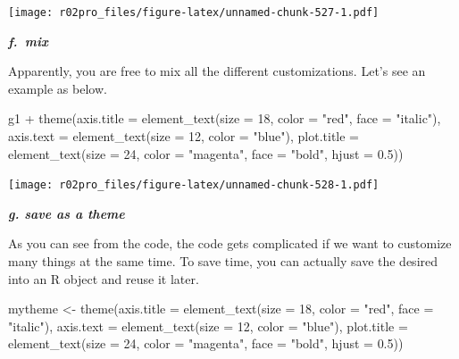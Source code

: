 \documentclass[
]{book}
\newenvironment{Shaded}{\begin{snugshade}}{\end{snugshade}}
\newcommand{\AttributeTok}[1]{\textcolor[rgb]{0.77,0.63,0.00}{#1}}
\newcommand{\DecValTok}[1]{\textcolor[rgb]{0.00,0.00,0.81}{#1}}
\newcommand{\FloatTok}[1]{\textcolor[rgb]{0.00,0.00,0.81}{#1}}
\newcommand{\FunctionTok}[1]{\textcolor[rgb]{0.00,0.00,0.00}{#1}}
\newcommand{\NormalTok}[1]{#1}
\newcommand{\OtherTok}[1]{\textcolor[rgb]{0.56,0.35,0.01}{#1}}
\newcommand{\SpecialCharTok}[1]{\textcolor[rgb]{0.00,0.00,0.00}{#1}}
\newcommand{\StringTok}[1]{\textcolor[rgb]{0.31,0.60,0.02}{#1}}
\begin{document}
\texttt{[image: r02pro\_files/figure-latex/unnamed-chunk-527-1.pdf]}

\textbf{\emph{f.~mix}}

Apparently, you are free to mix all the different customizations. Let's see an example as below.

\begin{Shaded}
\begin{Highlighting}[]
\NormalTok{g1 }\SpecialCharTok{+} \FunctionTok{theme}\NormalTok{(}\AttributeTok{axis.title =} \FunctionTok{element\_text}\NormalTok{(}\AttributeTok{size =} \DecValTok{18}\NormalTok{, }\AttributeTok{color =} \StringTok{"red"}\NormalTok{, }\AttributeTok{face =} \StringTok{"italic"}\NormalTok{), }\AttributeTok{axis.text =} \FunctionTok{element\_text}\NormalTok{(}\AttributeTok{size =} \DecValTok{12}\NormalTok{, }\AttributeTok{color =} \StringTok{"blue"}\NormalTok{), }\AttributeTok{plot.title =} \FunctionTok{element\_text}\NormalTok{(}\AttributeTok{size =} \DecValTok{24}\NormalTok{, }\AttributeTok{color =} \StringTok{"magenta"}\NormalTok{, }\AttributeTok{face =} \StringTok{"bold"}\NormalTok{, }\AttributeTok{hjust =} \FloatTok{0.5}\NormalTok{))}
\end{Highlighting}
\end{Shaded}

\texttt{[image: r02pro\_files/figure-latex/unnamed-chunk-528-1.pdf]}

\textbf{\emph{g. save as a theme}}

As you can see from the code, the code gets complicated if we want to customize many things at the same time. To save time, you can actually save the desired into an R object and reuse it later.

\begin{Shaded}
\begin{Highlighting}[]
\NormalTok{mytheme }\OtherTok{\textless{}{-}} \FunctionTok{theme}\NormalTok{(}\AttributeTok{axis.title =} \FunctionTok{element\_text}\NormalTok{(}\AttributeTok{size =} \DecValTok{18}\NormalTok{, }\AttributeTok{color =} \StringTok{"red"}\NormalTok{, }\AttributeTok{face =} \StringTok{"italic"}\NormalTok{), }\AttributeTok{axis.text =} \FunctionTok{element\_text}\NormalTok{(}\AttributeTok{size =} \DecValTok{12}\NormalTok{, }\AttributeTok{color =} \StringTok{"blue"}\NormalTok{), }\AttributeTok{plot.title =} \FunctionTok{element\_text}\NormalTok{(}\AttributeTok{size =} \DecValTok{24}\NormalTok{, }\AttributeTok{color =} \StringTok{"magenta"}\NormalTok{, }\AttributeTok{face =} \StringTok{"bold"}\NormalTok{, }\AttributeTok{hjust =} \FloatTok{0.5}\NormalTok{))}
\end{Highlighting}
\end{Shaded}
\end{document}
